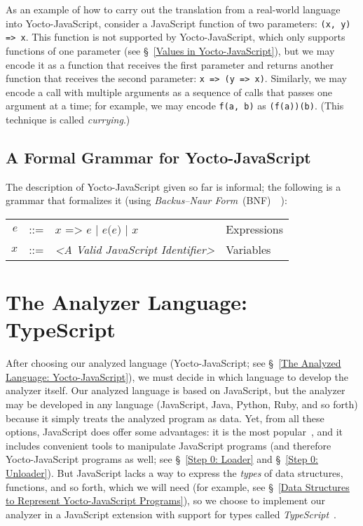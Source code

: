 \documentclass[12pt, oneside]{book}
\begin{document}
As an example of how to carry out the translation from a real-world language into Yocto-JavaScript, consider a JavaScript function of two parameters: \texttt{(x, y) => x}. This function is not supported by Yocto-JavaScript, which only supports functions of one parameter (see §~\ref{Values in Yocto-JavaScript}), but we may encode it as a function that receives the first parameter and returns another function that receives the second parameter: \texttt{x => (y => x)}. Similarly, we may encode a call with multiple arguments as a sequence of calls that passes one argument at a time; for example, we may encode \texttt{f(a, b)} as \texttt{(f(a))(b)}. (This technique is called \emph{currying}.)

\subsection{A Formal Grammar for Yocto-JavaScript}
\label{A Formal Grammar for Yocto-JavaScript}

The description of Yocto-JavaScript given so far is informal; the following is a grammar that formalizes it (using \emph{Backus–Naur Form}~(BNF)~\cite{bnf}~\cite[§~4.2]{dragon-book}):

\begin{center}
\begin{tabular}{rcll}
$e$ & ::= & $x\texttt{ => }e$ | $e\texttt{(}e\texttt{)}$ | $x$ & Expressions \\
$x$ & ::= & \emph{<A Valid JavaScript Identifier>} & Variables \\
\end{tabular}
\end{center}

\section{The Analyzer Language: TypeScript}
\label{The Analyzer Language: TypeScript}

After choosing our analyzed language (Yocto-JavaScript; see §~\ref{The Analyzed Language: Yocto-JavaScript}), we must decide in which language to develop the analyzer itself. Our analyzed language is based on JavaScript, but the analyzer may be developed in any language (JavaScript, Java, Python, Ruby, and so forth) because it simply treats the analyzed program as data. Yet, from all these options, JavaScript does offer some advantages: it is the most popular~\cite{stack-overflow-developer-survey, jet-brains-developer-survey}, and it includes convenient tools to manipulate JavaScript programs (and therefore Yocto-JavaScript programs as well; see §~\ref{Step 0: Loader} and §~\ref{Step 0: Unloader}). But JavaScript lacks a way to express the \emph{types} of data structures, functions, and so forth, which we will need (for example, see §~\ref{Data Structures to Represent Yocto-JavaScript Programs}), so we choose to implement our analyzer in a JavaScript extension with support for types called \emph{TypeScript}~\cite{typescript, typescript-deep-dive, understanding-typescript}.
\end{document}
